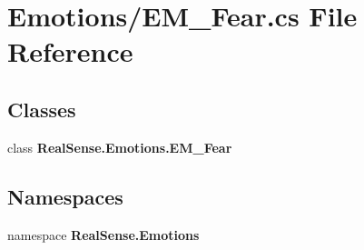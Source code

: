 \section{Emotions/\+E\+M\+\_\+\+Fear.cs File Reference}
\label{_e_m___fear_8cs}
\subsection*{Classes}
\begin{DoxyCompactItemize}
\item 
class \textbf{ Real\+Sense.\+Emotions.\+E\+M\+\_\+\+Fear}
\end{DoxyCompactItemize}
\subsection*{Namespaces}
\begin{DoxyCompactItemize}
\item 
namespace \textbf{ Real\+Sense.\+Emotions}
\end{DoxyCompactItemize}
